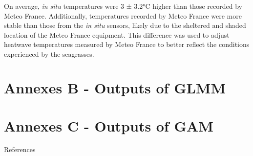 \documentclass[
  letterpaper,
  DIV=11,
  numbers=noendperiod]{scrartcl}
\begin{document}
On average, \emph{in situ} temperatures were 3 ± 3.2°C higher than those
recorded by Meteo France. Additionally, temperatures recorded by Meteo
France were more stable than those from the \emph{in situ} sensors,
likely due to the sheltered and shaded location of the Meteo France
equipment. This difference was used to adjust heatwave temperatures
measured by Meteo France to better reflect the conditions experienced by
the seagrasses.

\section{Annexes B - Outputs of GLMM}\label{sec-AnnexeB}

\section{Annexes C - Outputs of GAM}\label{sec-AnnexeC}

References
\end{document}

